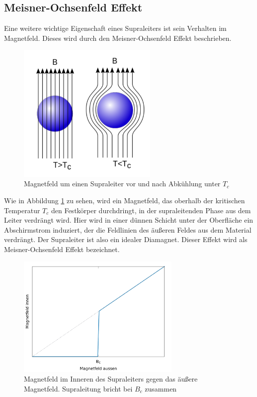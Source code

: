 	\subsection{Meisner-Ochsenfeld Effekt}
Eine weitere wichtige Eigenschaft eines Supraleiters ist sein Verhalten im 
Magnetfeld. Dieses wird durch den Meisner-Ochsenfeld Effekt beschrieben.
\begin{figure}[h]
	\centering
	\includegraphics[width=0.6\textwidth]{Abb/meisner.pdf}
	\caption{Magnetfeld um einen Supraleiter vor und nach Abkühlung unter $T_c$ 
	\cite{meisnerwiki}}
	\label{Abb:meisner}
\end{figure}
Wie in Abbildung \ref{Abb:meisner} zu sehen, wird ein Magnetfeld, das oberhalb der
kritischen Temperatur $T_c$ den Festkörper durchdringt, in der supraleitenden Phase
aus dem Leiter verdrängt wird. Hier wird in einer dünnen Schicht unter der 
Oberfläche ein Abschirmstrom induziert, der die Feldlinien des äußeren Feldes aus
dem Material verdrängt. Der Supraleiter ist also ein idealer Diamagnet. Dieser 
Effekt wird als Meisner-Ochsenfeld Effekt bezeichnet. 
\begin{figure}[h]
	\centering
	\includegraphics[width=0.7\textwidth]{Abb/plotb.pdf}
	\caption{Magnetfeld im Inneren des Supraleiters gegen das äußere Magnetfeld.
			 Supraleitung bricht bei $B_c$ zusammen}
	\label{plotb}
\end{figure}
